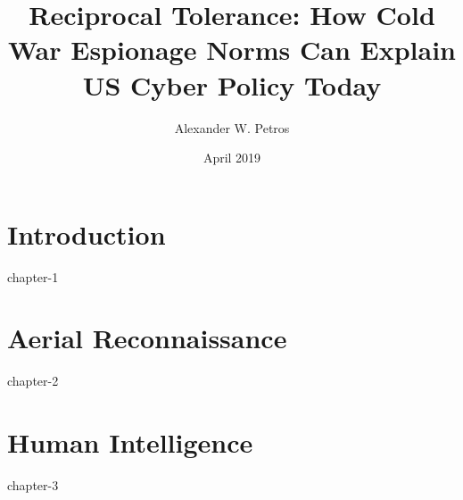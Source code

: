 \documentclass{report}
\title{Reciprocal Tolerance: How Cold War Espionage Norms Can Explain US Cyber Policy Today}
\author{Alexander W. Petros}
\date{April 2019}
\begin{document}
    \maketitle

    \chapter{Introduction}
    {chapter-1}

    \chapter{Aerial Reconnaissance}
    {chapter-2}

    \chapter{Human Intelligence}
    {chapter-3}
\end{document}
